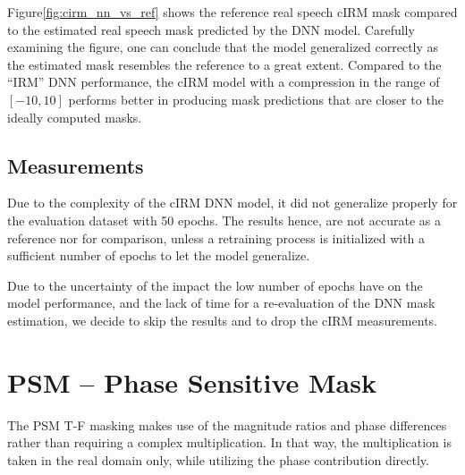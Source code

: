 Figure\;\ref{fig:cirm_nn_vs_ref} shows the reference real speech cIRM mask
compared to the estimated real speech mask predicted by the DNN model.
Carefully examining the figure, one can conclude that the model generalized correctly
as the estimated mask resembles the reference to a great extent.
Compared to the ``IRM'' DNN performance, the cIRM model 
with a compression in the range of \([-10, 10]\) 
performs better in producing mask predictions that are closer
to the ideally computed masks.

\subsection{Measurements}
Due to the complexity of the cIRM DNN model, 
it did not generalize properly for the evaluation dataset
with 50 epochs.
The results hence, are not accurate as a reference nor for comparison,
unless a retraining process is initialized with a sufficient number of epochs
to let the model generalize.

Due to the uncertainty of the impact the low number of epochs have
on the model performance, and the lack of time for a re-evaluation of the
DNN mask estimation, we decide to skip the results and 
to drop the cIRM measurements.


\section{PSM -- Phase Sensitive Mask}
The PSM T-F masking makes use of the magnitude ratios and phase differences
rather than requiring a complex multiplication.
In that way, the multiplication is taken in the real domain only,
while utilizing the phase contribution directly.

